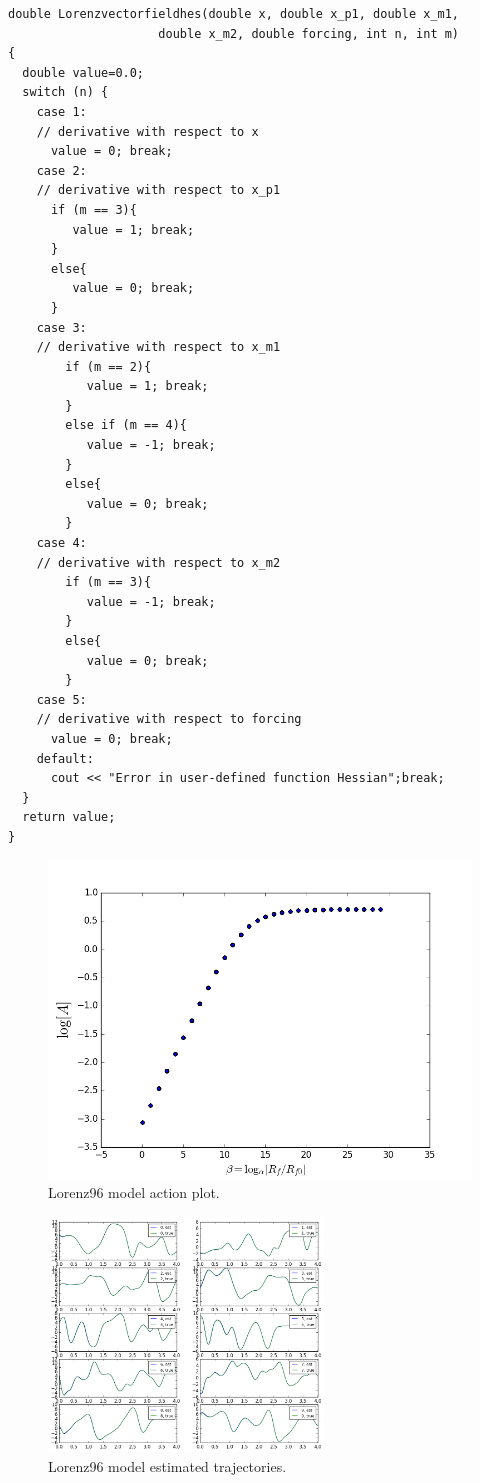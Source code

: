 \documentclass[11pt]{article}
\begin{document}
{\begin{verbatim}
double Lorenzvectorfieldhes(double x, double x_p1, double x_m1, 
                     double x_m2, double forcing, int n, int m)
{
  double value=0.0;
  switch (n) {
    case 1:
    // derivative with respect to x
      value = 0; break;
    case 2:
    // derivative with respect to x_p1
      if (m == 3){
         value = 1; break;
      }
      else{
         value = 0; break;
      }      
    case 3:
    // derivative with respect to x_m1
        if (m == 2){
           value = 1; break;
        }
        else if (m == 4){
           value = -1; break;
        }      
        else{
           value = 0; break;
        }      
    case 4:
    // derivative with respect to x_m2
        if (m == 3){
           value = -1; break;
        }
        else{
           value = 0; break;
        }      
    case 5:
    // derivative with respect to forcing
      value = 0; break;
    default:
      cout << "Error in user-defined function Hessian";break;
  } 
  return value;
}
\end{verbatim}


\begin{figure}[h]
\centering
\includegraphics[width=.45\textwidth]{figure/Lorenz96_ext/action.png}
\caption{Lorenz96 model action plot.}
\label{fig:Lorenz96_ext_action}
\end{figure}

\begin{figure}[h]
\centering
\includegraphics[width=0.65\textwidth]{figure/Lorenz96_ext/estimation.png}
\caption{Lorenz96 model estimated trajectories.}
\label{fig:Lorenz96_ext_path}
\end{figure}





}
\end{document}
